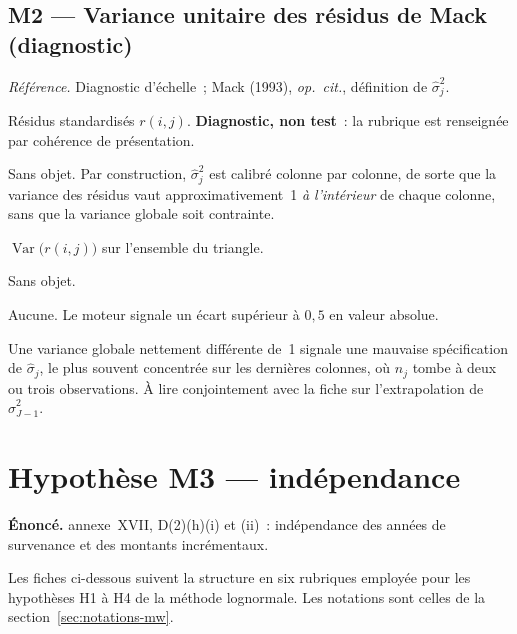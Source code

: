 \documentclass[a4paper,11pt]{article}
\newcommand{\refl}[1]{{\small\textcolor{maincolor!70!black}{\textit{Référence.} #1}}\par\smallskip}
\newcounter{ficheid}
\newenvironment{fiche}[1]{%
  \stepcounter{ficheid}%
  \phantomsection
  \subsection{#1}%
  \label{fiche:\theficheid}%
}{%
  \end{description}\vspace{0.5em}%
}
\newcommand{\Cadre}{%
  \begin{description}[leftmargin=0pt, style=unboxed, itemsep=3pt, topsep=3pt, parsep=2pt]%
  \item[\textcolor{financeblue}{\textbf{1. Cadre, notations et hypothèses de validité (non testées).}}]}
\newcommand{\Hzero}{\item[\textcolor{financeblue}{\textbf{2. Hypothèse nulle.}}]}
\newcommand{\Stat}{\item[\textcolor{financeblue}{\textbf{3. Statistique de test.}}]}
\newcommand{\Loi}{\item[\textcolor{financeblue}{\textbf{4. Loi sous $H_0$.}}]}
\newcommand{\Pval}{\item[\textcolor{financeblue}{\textbf{5. p-value.}}]}
\newcommand{\Usage}{\item[\textcolor{financeblue}{\textbf{6. Usage et limites.}}]}
\begin{document}
\begin{fiche}{M2 --- Variance unitaire des résidus de Mack (diagnostic)}
\label{mw:m2var}
\refl{Diagnostic d'échelle~; Mack (1993), \emph{op.\ cit.}, définition de
$\hat\sigma_j^2$.}
\Cadre
Résidus standardisés $r(i,j)$. \textbf{Diagnostic, non test}~: la rubrique est
renseignée par cohérence de présentation.
\Hzero
Sans objet. Par construction, $\hat\sigma_j^2$ est calibré colonne par colonne,
de sorte que la variance des résidus vaut approximativement~1 \emph{à
l'intérieur} de chaque colonne, sans que la variance globale soit contrainte.
\Stat
$\operatorname{Var}\big(r(i,j)\big)$ sur l'ensemble du triangle.
\Loi
Sans objet.
\Pval
Aucune. Le moteur signale un écart supérieur à $0{,}5$ en valeur absolue.
\Usage
Une variance globale nettement différente de~1 signale une mauvaise
spécification de $\hat\sigma_j$, le plus souvent concentrée sur les dernières
colonnes, où $n_j$ tombe à deux ou trois observations. À lire conjointement avec
la fiche sur l'extrapolation de $\hat\sigma^2_{J-1}$.
\end{fiche}

\clearpage
\section{Hypothèse M3 --- indépendance}
\label{sec:mwm3}

\begin{encadre}
\textbf{Énoncé.} annexe~XVII, D(2)(h)(i) et (ii)~: indépendance des années de survenance et des montants incrémentaux.
\end{encadre}

Les fiches ci-dessous suivent la structure en six rubriques employée pour les
hypothèses H1 à H4 de la méthode lognormale. Les notations sont celles de la
section~\ref{sec:notations-mw}.
\end{document}
